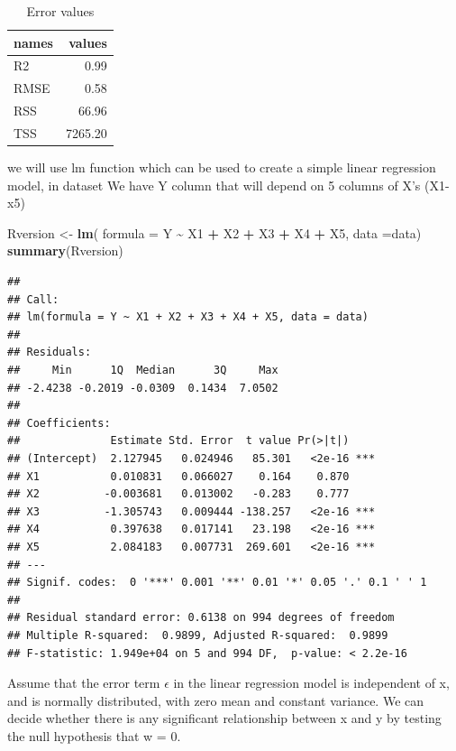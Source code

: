 \documentclass[a4paper,conference]{IEEEtran}
\newenvironment{Shaded}{\begin{snugshade}}{\end{snugshade}}
\newcommand{\AttributeTok}[1]{\textcolor[rgb]{0.13,0.29,0.53}{#1}}
\newcommand{\FunctionTok}[1]{\textcolor[rgb]{0.13,0.29,0.53}{\textbf{#1}}}
\newcommand{\NormalTok}[1]{#1}
\newcommand{\OtherTok}[1]{\textcolor[rgb]{0.56,0.35,0.01}{#1}}
\newcommand{\SpecialCharTok}[1]{\textcolor[rgb]{0.81,0.36,0.00}{\textbf{#1}}}
\begin{document}
\begin{table}[!t]
\centering
\caption{Error values} 
\label{tbl:xtable.floating}
\begin{tabular}{lr}
  \hline
names & values \\ 
  \hline
R2 & 0.99 \\ 
  RMSE & 0.58 \\ 
  RSS & 66.96 \\ 
  TSS & 7265.20 \\ 
   \hline
\end{tabular}
\end{table}

we will use lm function which can be used to create a simple linear
regression model, in dataset We have Y column that will depend on 5
columns of X's (X1-x5)

\begin{Shaded}
\begin{Highlighting}[]
\NormalTok{Rversion }\OtherTok{\textless{}{-}} \FunctionTok{lm}\NormalTok{(}
  \AttributeTok{formula =}\NormalTok{ Y }\SpecialCharTok{\textasciitilde{}}\NormalTok{ X1 }\SpecialCharTok{+}\NormalTok{ X2 }\SpecialCharTok{+}\NormalTok{ X3 }\SpecialCharTok{+}\NormalTok{ X4 }\SpecialCharTok{+}\NormalTok{ X5,}
  \AttributeTok{data =}\NormalTok{data)}
\FunctionTok{summary}\NormalTok{(Rversion)}
\end{Highlighting}
\end{Shaded}

\begin{verbatim}
## 
## Call:
## lm(formula = Y ~ X1 + X2 + X3 + X4 + X5, data = data)
## 
## Residuals:
##     Min      1Q  Median      3Q     Max 
## -2.4238 -0.2019 -0.0309  0.1434  7.0502 
## 
## Coefficients:
##              Estimate Std. Error  t value Pr(>|t|)    
## (Intercept)  2.127945   0.024946   85.301   <2e-16 ***
## X1           0.010831   0.066027    0.164    0.870    
## X2          -0.003681   0.013002   -0.283    0.777    
## X3          -1.305743   0.009444 -138.257   <2e-16 ***
## X4           0.397638   0.017141   23.198   <2e-16 ***
## X5           2.084183   0.007731  269.601   <2e-16 ***
## ---
## Signif. codes:  0 '***' 0.001 '**' 0.01 '*' 0.05 '.' 0.1 ' ' 1
## 
## Residual standard error: 0.6138 on 994 degrees of freedom
## Multiple R-squared:  0.9899, Adjusted R-squared:  0.9899 
## F-statistic: 1.949e+04 on 5 and 994 DF,  p-value: < 2.2e-16
\end{verbatim}

Assume that the error term \(\epsilon\) in the linear regression model
is independent of x, and is normally distributed, with zero mean and
constant variance. We can decide whether there is any significant
relationship between x and y by testing the null hypothesis that w = 0.
\end{document}
